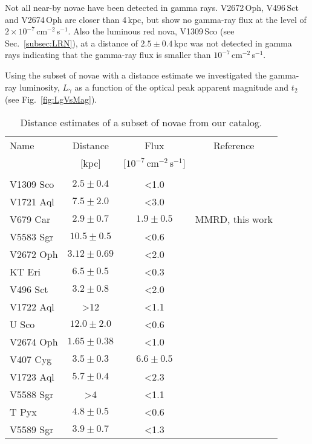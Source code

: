 \documentclass{aa} %
\begin{document}
Not all near-by novae have been detected in gamma rays. V2672\,Oph, V496\,Sct and V2674\,Oph are closer than 4\,kpc, but show no gamma-ray flux at the level of $2\times10^{-7}$\,cm$^{-2}$\,s$^{-1}$. Also the luminous red nova, V1309\,Sco (see Sec.~\ref{subsec:LRN}), at a distance of $2.5\pm0.4$\,kpc was not detected in gamma rays indicating that the gamma-ray flux is smaller than $10^{-7}$\,cm$^{-2}$\,s$^{-1}$.

Using the subset of novae with a distance estimate we investigated the gamma-ray luminosity, $L_\gamma$ as a function of the optical peak apparent magnitude and $t_2$ (see Fig.~\ref{fig:LgVsMag}).

\begin{table*}
\caption{Distance estimates of a subset of novae from our catalog.}
\label{tab:distance}
\centering
\begin{tabular}{lccc}
\hline\hline
Name & Distance & Flux                                             & Reference\\
           & [kpc]       & [$10^{-7}$\,cm$^{-2}$\,s$^{-1}$] & \\
            \hline\\
V1309 Sco & $2.5\pm0.4$ & <1.0 & \citet{Oezdoenmez}\\
V1721 Aql & $7.5\pm2.0$ & <3.0 & \citet{Oezdoenmez}\\
V679 Car & $2.9\pm0.7$ & $1.9\pm0.5$ & MMRD, this work\\
V5583 Sgr & $10.5\pm0.5$ & <0.6 & \citet{Schwarz2011}\\
V2672 Oph & $3.12\pm0.69$ & <2.0 & \citet{Oezdoenmez}\\
KT Eri & $6.5\pm0.5$ & <0.3 & \citet{ATel2327}\\
V496 Sct & $3.2\pm0.8$ & <2.0 & \citet{Oezdoenmez}\\
V1722 Aql & >12 & <1.1 & \citet{Munari2010a}\\
U Sco & $12.0\pm2.0$ & <0.6 & \citet{Schaefer2010}\\
V2674 Oph & $1.65\pm0.38$ & <1.0 & \citet{Oezdoenmez}\\
V407 Cyg & $3.5\pm0.3$ & $6.6\pm0.5$ & \citet{Oezdoenmez}\\
V1723 Aql & $5.7\pm0.4$ & <2.3 & \citet{2016MNRAS.457..887W}\\
V5588 Sgr & >4 & <1.1 & \citet{Munari2015a}\\
T Pyx & $4.8\pm0.5$ & <0.6 & \citet{2013ApJ...770L..33S}\\
V5589 Sgr & $3.9\pm0.7$ & <1.3 & \citet{2016MNRAS.460.2687W}\\

\end{tabular}
\end{table*}
\end{document}
